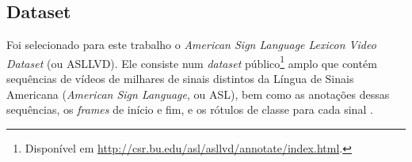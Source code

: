 

\subsection{Dataset} %
\label{sec:dataset}

Foi selecionado para este trabalho o \textit{American Sign Language Lexicon Video Dataset} (ou ASLLVD). Ele consiste num \textit{dataset} público\footnote{
    Disponível em \url{http://csr.bu.edu/asl/asllvd/annotate/index.html}.
} amplo que contém sequências de vídeos de milhares de sinais distintos da Língua de Sinais Americana (\textit{American Sign Language}, ou ASL), bem como as anotações dessas sequências, os \textit{frames} de início e fim, e os rótulos de classe para cada sinal \cite{athitsos-asllvd-2008, neidle-2012, vloger-2012}.

